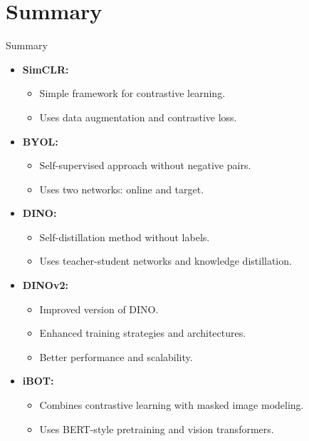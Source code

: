 \section{Summary}
\begin{frame}[allowframebreaks]{Summary}
\begin{itemize}
    \item \textbf{SimCLR:}
    \begin{itemize}
        \item Simple framework for contrastive learning.
        \item Uses data augmentation and contrastive loss.
    \end{itemize}
    \item \textbf{BYOL:}
    \begin{itemize}
        \item Self-supervised approach without negative pairs.
        \item Uses two networks: online and target.
    \end{itemize}
    \item \textbf{DINO:}
    \begin{itemize}
        \item Self-distillation method without labels.
        \item Uses teacher-student networks and knowledge distillation.
    \end{itemize}

    \framebreak

    \item \textbf{DINOv2:}
    \begin{itemize}
        \item Improved version of DINO.
        \item Enhanced training strategies and architectures.
        \item Better performance and scalability.
    \end{itemize}
    \item \textbf{iBOT:}
    \begin{itemize}
        \item Combines contrastive learning with masked image modeling.
        \item Uses BERT-style pretraining and vision transformers.
    \end{itemize}
\end{itemize}
\end{frame}